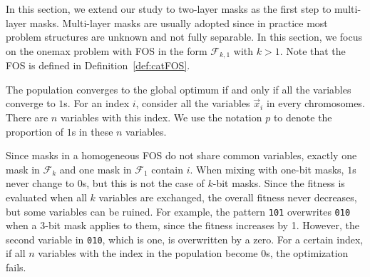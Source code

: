 \documentclass{sig-alternate}
\begin{document}
In this section, we extend our study to two-layer masks as the first step to multi-layer masks.
Multi-layer masks are usually adopted since in practice most problem structures are unknown and not fully separable.
In this section, we focus on the onemax problem with FOS in the form ${\mathcal F}_{k,1}$ with $k>1$. %
Note that the FOS is defined in Definition~\ref{def:catFOS}.


The population converges to the global optimum if and only if all the variables converge to $1$s.
For an index $i$, consider all the variables $\vec{x}_i$ in every chromosomes. %
There are $n$ variables with this index.
We use the notation $p$ to denote the proportion of $1$s in these $n$ variables.

Since masks in a homogeneous FOS do not share common variables,
exactly one mask in ${\mathcal F}_k$ and one mask in ${\mathcal F}_1$ contain $i$.
When mixing with one-bit masks, $1$s never change to $0$s,
but this is not the case of $k$-bit masks.
Since the fitness is evaluated when all $k$ variables are exchanged,
the overall fitness never decreases, but some variables can be ruined.
For example, the pattern {\tt 101} overwrites {\tt 010} when a 3-bit mask applies to them, %
since the fitness increases by 1.
However, the second variable in {\tt 010}, which is one, is overwritten by a zero.
For a certain index, if all $n$ variables with the index in the population become $0$s,
the optimization fails.
\end{document}
